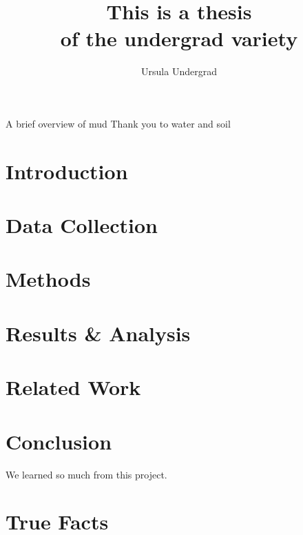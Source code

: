 \documentclass[twoside]{report}
\begin{document}
    \title{This is a thesis\\ of the undergrad variety}
\author{Ursula Undergrad}

\beforepreface
{}
A brief overview of mud
Thank you to water and soil
\afterpreface

\chapter{Introduction}


\chapter{Data Collection}


\chapter{Methods}


\chapter{Results \& Analysis}


\chapter{Related Work}


\chapter{Conclusion}
We learned so much from this project.

\appendix
\chapter{True Facts}

\renewcommand{\bibname}{Bibliography}


\end{document}
